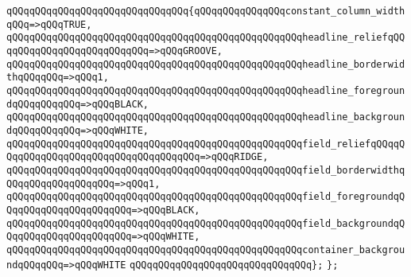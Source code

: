 \verb|qQQqqQQqqQQqqQQqqQQqqQQqqQQqqQQq{qQQqqQQqqQQqqQQqconstant_column_widthqQQq=>qQQqTRUE,|\newline
\verb|qQQqqQQqqQQqqQQqqQQqqQQqqQQqqQQqqQQqqQQqqQQqqQQqqQQqheadline_reliefqQQqqQQqqQQqqQQqqQQqqQQqqQQq=>qQQqGROOVE,|\newline
\verb|qQQqqQQqqQQqqQQqqQQqqQQqqQQqqQQqqQQqqQQqqQQqqQQqqQQqheadline_borderwidthqQQqqQQq=>qQQq1,|\newline
\verb|qQQqqQQqqQQqqQQqqQQqqQQqqQQqqQQqqQQqqQQqqQQqqQQqqQQqheadline_foregroundqQQqqQQqqQQq=>qQQqBLACK,|\newline
\verb|qQQqqQQqqQQqqQQqqQQqqQQqqQQqqQQqqQQqqQQqqQQqqQQqqQQqheadline_backgroundqQQqqQQqqQQq=>qQQqWHITE,|\newline
\verb|qQQqqQQqqQQqqQQqqQQqqQQqqQQqqQQqqQQqqQQqqQQqqQQqqQQqfield_reliefqQQqqQQqqQQqqQQqqQQqqQQqqQQqqQQqqQQqqQQq=>qQQqRIDGE,|\newline
\verb|qQQqqQQqqQQqqQQqqQQqqQQqqQQqqQQqqQQqqQQqqQQqqQQqqQQqfield_borderwidthqQQqqQQqqQQqqQQqqQQq=>qQQq1,|\newline
\verb|qQQqqQQqqQQqqQQqqQQqqQQqqQQqqQQqqQQqqQQqqQQqqQQqqQQqfield_foregroundqQQqqQQqqQQqqQQqqQQqqQQq=>qQQqBLACK,|\newline
\verb|qQQqqQQqqQQqqQQqqQQqqQQqqQQqqQQqqQQqqQQqqQQqqQQqqQQqfield_backgroundqQQqqQQqqQQqqQQqqQQqqQQq=>qQQqWHITE,|\newline
\verb|qQQqqQQqqQQqqQQqqQQqqQQqqQQqqQQqqQQqqQQqqQQqqQQqqQQqcontainer_backgroundqQQqqQQq=>qQQqWHITE|\newline
\verb|qQQqqQQqqQQqqQQqqQQqqQQqqQQqqQQq};|\newline
\verb|};|\newline
\newline

